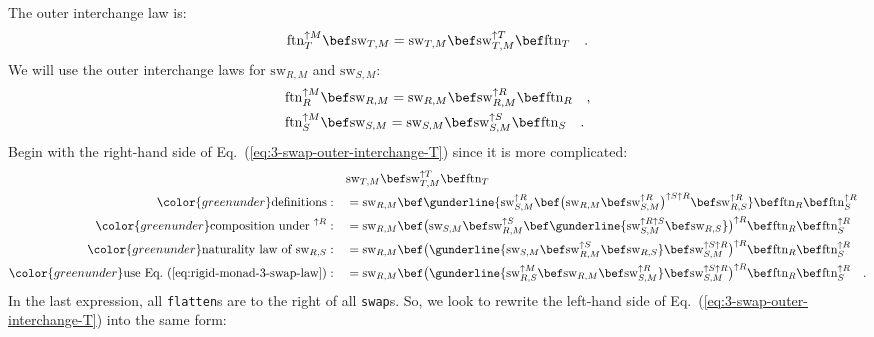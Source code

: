 The outer interchange law is:
\begin{equation}
\text{ftn}_{T}^{\uparrow M}\bef\text{sw}_{T,M}=\text{sw}_{T,M}\bef\text{sw}_{T,M}^{\uparrow T}\bef\text{ftn}_{T}\quad.\label{eq:3-swap-outer-interchange-T}
\end{equation}
We will use the outer interchange laws for $\text{sw}_{R,M}$ and
$\text{sw}_{S,M}$:
\begin{align}
 & \text{ftn}_{R}^{\uparrow M}\bef\text{sw}_{R,M}=\text{sw}_{R,M}\bef\text{sw}_{R,M}^{\uparrow R}\bef\text{ftn}_{R}\quad,\label{eq:3-swap-outer-interchange-R}\\
 & \text{ftn}_{S}^{\uparrow M}\bef\text{sw}_{S,M}=\text{sw}_{S,M}\bef\text{sw}_{S,M}^{\uparrow S}\bef\text{ftn}_{S}\quad.\label{eq:3-swap-outer-interchange-S}
\end{align}
Begin with the right-hand side of Eq.~(\ref{eq:3-swap-outer-interchange-T})
since it is more complicated:
\begin{align*}
 & \text{sw}_{T,M}\bef\text{sw}_{T,M}^{\uparrow T}\bef\text{ftn}_{T}\\
{\color{greenunder}\text{definitions}:}\quad & =\text{sw}_{R,M}\bef\gunderline{\text{sw}_{S,M}^{\uparrow R}\bef\big(\text{sw}_{R,M}\bef\text{sw}_{S,M}^{\uparrow R}\big)^{\uparrow S\uparrow R}\bef\text{sw}_{R,S}^{\uparrow R}}\bef\text{ftn}_{R}\bef\text{ftn}_{S}^{\uparrow R}\\
{\color{greenunder}\text{composition under }^{\uparrow R}:}\quad & =\text{sw}_{R,M}\bef\big(\text{sw}_{S,M}\bef\text{sw}_{R,M}^{\uparrow S}\bef\gunderline{\text{sw}_{S,M}^{\uparrow R\uparrow S}\bef\text{sw}_{R,S}}\big)^{\uparrow R}\bef\text{ftn}_{R}\bef\text{ftn}_{S}^{\uparrow R}\\
{\color{greenunder}\text{naturality law of }\text{sw}_{R,S}:}\quad & =\text{sw}_{R,M}\bef\big(\gunderline{\text{sw}_{S,M}\bef\text{sw}_{R,M}^{\uparrow S}\bef\text{sw}_{R,S}}\bef\text{sw}_{S,M}^{\uparrow S\uparrow R}\big)^{\uparrow R}\bef\text{ftn}_{R}\bef\text{ftn}_{S}^{\uparrow R}\\
{\color{greenunder}\text{use Eq.~(\ref{eq:rigid-monad-3-swap-law})}:}\quad & =\text{sw}_{R,M}\bef\big(\gunderline{\text{sw}_{R,S}^{\uparrow M}\bef\text{sw}_{R,M}\bef\text{sw}_{S,M}^{\uparrow R}}\bef\text{sw}_{S,M}^{\uparrow S\uparrow R}\big)^{\uparrow R}\bef\text{ftn}_{R}\bef\text{ftn}_{S}^{\uparrow R}\quad.
\end{align*}
In the last expression, all \lstinline!flatten!s are to the right
of all \lstinline!swap!s. So, we look to rewrite the left-hand side
of Eq.~(\ref{eq:3-swap-outer-interchange-T}) into the same form:
